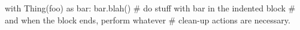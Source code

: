 \documentclass[multi, border=10]{standalone}
\begin{document}
\begin{fixedheightcode}
with Thing(foo) as bar:
    bar.blah()
    # do stuff with bar in the indented block
    # and when the block ends, perform whatever 
    # clean-up actions are necessary.
\end{fixedheightcode}
\end{document}
